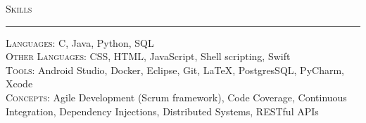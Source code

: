 \documentclass{res}
\begin{document}
\begin{resume}
\textsc{{\Large Skills}}
\vspace{0.5mm}
\hrule width18.5cm
	\textsc{Languages:} C, Java, Python, SQL\\[2mm]
	\textsc{Other Languages:} CSS, HTML, JavaScript, Shell scripting, Swift\\[2mm]
	\textsc{Tools:} Android Studio, Docker, Eclipse, Git, \LaTeX, PostgresSQL, PyCharm, Xcode\\[2mm]
	\textsc{Concepts:} Agile Development (Scrum framework), Code Coverage, Continuous Integration, Dependency Injections, Distributed Systems, RESTful APIs\\[0.5mm]
\vspace{-1mm}

\end{resume}
\end{document}

